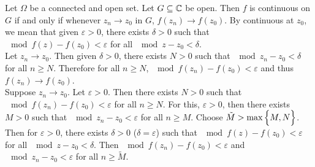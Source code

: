 \documentclass[12pt]{article}
\begin{document}
Let $\Omega$ be a connected and open set. Let $G \subseteq \mathbb{C}$ be open. Then $f$ is continuous on $G$ if and only if whenever $z_n \to z_0$ in $G$, $f(z_n) \to f(z_0)$. By continuous at $z_0$, we mean that given $\varepsilon > 0$, there exists $\delta > 0$ such that $\mod{f(z) - f(z_0)} < \varepsilon$ for all $\mod{z - z_0} < \delta$. \\
Let $z_n \to z_0$. Then given $\delta > 0$, there exists $N > 0$ such that $\mod{z_n - z_0} < \delta$ for all $n \geq N$. Therefore for all $n \geq N$, $\mod{f(z_n) - f(z_0)} < \varepsilon$ and thus $f(z_n) \to f(z_0)$. \\
Suppose $z_n \to z_0$. Let $\varepsilon > 0$. Then there exists $N > 0$ such that $\mod{f(z_n) - f(z_0)} < \varepsilon$ for all $n \geq N$. For this, $\varepsilon > 0$, then there exists $M > 0$ such that $\mod{z_n - z_0} < \varepsilon$ for all $n \geq M$. Choose $\tilde{M} > \max\Big\{ M,N \Big\}$. Then for $\varepsilon > 0$, there exists $\delta > 0$ ($\delta = \varepsilon$) such that $\mod{f(z) - f(z_0)} < \varepsilon$ for all $\mod{z - z_0} < \delta$. 
Then $\mod{f(z_n) - f(z_0)} < \varepsilon$ and $\mod{z_n - z_0} < \varepsilon$ for all $ n \geq \tilde{M}$. 
\end{document}
